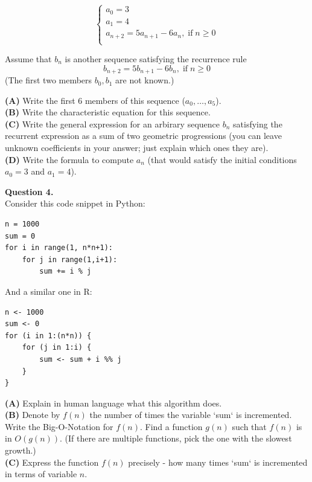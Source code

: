 \documentclass[jou]{apa6}
\begin{document}
$$\left\{ \begin{array}{l}
a_0 = 3\\
a_1 = 4\\
a_{n+2} = 5a_{n+1} - 6a_n,\;\text{if}\;n \geq 0 \\
\end{array} \right.$$

Assume that $b_n$ is another sequence satisfying the 
recurrence rule
$$b_{n+2} = 5b_{n+1} - 6b_n,\;\text{if}\;n \geq 0$$
(The first two members $b_0,b_1$ are not known.)

{\bf (A)} Write the first $6$ members of this sequence ($a_0,\ldots,a_5$).\\
{\bf (B)} Write the characteristic equation for this sequence.\\
{\bf (C)} Write the general expression for an arbirary sequence $b_n$
satisfying the recurrent expression as a sum of two geometric progressions 
(you can leave unknown coefficients in your answer; just explain which ones they are).\\
{\bf (D)} Write the formula to compute $a_n$ (that would satisfy 
the initial conditions $a_0 = 3$ and $a_1 = 4$).


\vspace{10pt}
{\bf Question 4.}\\ 
Consider this code snippet in Python:

\begin{verbatim}
n = 1000
sum = 0
for i in range(1, n*n+1):
    for j in range(1,i+1):
        sum += i % j
\end{verbatim}

And a similar one in R:

\begin{verbatim}
n <- 1000
sum <- 0
for (i in 1:(n*n)) {
    for (j in 1:i) {
        sum <- sum + i %% j
    }
}
\end{verbatim}

{\bf (A)} Explain in human language what this algorithm does.\\
{\bf (B)} Denote by $f(n)$ the 
number of times the variable `sum` is incremented. 
Write the Big-O-Notation for $f(n)$. Find 
a function $g(n)$ such that 
$f(n)$ is in $O(g(n))$. (If there are multiple functions, 
pick the one with the slowest growth.)\\
{\bf (C)} Express the function $f(n)$ precisely - 
how many times `sum` is incremented in terms of variable $n$. 
\end{document}
